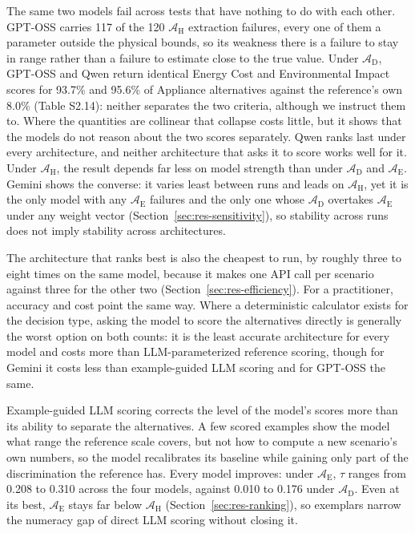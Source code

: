 \documentclass[final,3p,times]{elsarticle}
\begin{document}
The same two models fail across tests that have nothing to do with each other. GPT-OSS carries 117 of the 120 $\mathcal{A}_{\text{H}}$ extraction failures, every one of them a parameter outside the physical bounds, so its weakness there is a failure to stay in range rather than a failure to estimate close to the true value. Under $\mathcal{A}_{\text{D}}$, GPT-OSS and Qwen return identical Energy Cost and Environmental Impact scores for 93.7\% and 95.6\% of Appliance alternatives against the reference's own 8.0\% (Table S2.14): neither separates the two criteria, although we instruct them to. Where the quantities are collinear that collapse costs little, but it shows that the models do not reason about the two scores separately. Qwen ranks last under every architecture, and neither architecture that asks it to score works well for it. Under $\mathcal{A}_{\text{H}}$, the result depends far less on model strength than under $\mathcal{A}_{\text{D}}$ and $\mathcal{A}_{\text{E}}$. Gemini shows the converse: it varies least between runs and leads on $\mathcal{A}_{\text{H}}$, yet it is the only model with any $\mathcal{A}_{\text{E}}$ failures and the only one whose $\mathcal{A}_{\text{D}}$ overtakes $\mathcal{A}_{\text{E}}$ under any weight vector (Section~\ref{sec:res-sensitivity}), so stability across runs does not imply stability across architectures.

The architecture that ranks best is also the cheapest to run, by roughly three to eight times on the same model, because it makes one API call per scenario against three for the other two (Section~\ref{sec:res-efficiency}). For a practitioner, accuracy and cost point the same way. Where a deterministic calculator exists for the decision type, asking the model to score the alternatives directly is generally the worst option on both counts: it is the least accurate architecture for every model and costs more than LLM-parameterized reference scoring, though for Gemini it costs less than example-guided LLM scoring and for GPT-OSS the same.

Example-guided LLM scoring corrects the level of the model's scores more than its ability to separate the alternatives. A few scored examples show the model what range the reference scale covers, but not how to compute a new scenario's own numbers, so the model recalibrates its baseline while gaining only part of the discrimination the reference has. Every model improves: under $\mathcal{A}_{\text{E}}$, $\tau$ ranges from 0.208 to 0.310 across the four models, against 0.010 to 0.176 under $\mathcal{A}_{\text{D}}$. Even at its best, $\mathcal{A}_{\text{E}}$ stays far below $\mathcal{A}_{\text{H}}$ (Section~\ref{sec:res-ranking}), so exemplars narrow the numeracy gap of direct LLM scoring without closing it.
\end{document}
